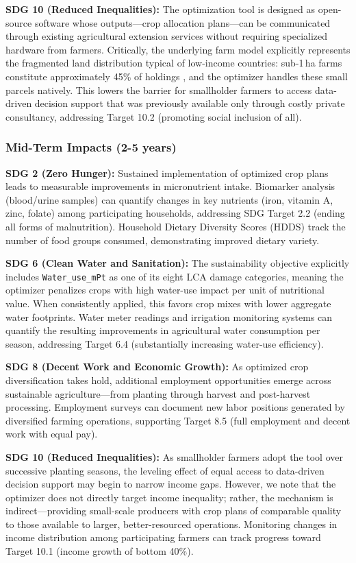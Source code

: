\documentclass{oqireport}
\begin{document}
\textbf{SDG 10 (Reduced Inequalities):} The optimization tool is designed as open-source software whose outputs---crop allocation plans---can be communicated through existing agricultural extension services without requiring specialized hardware from farmers. Critically, the underlying farm model explicitly represents the fragmented land distribution typical of low-income countries: sub-1\,ha farms constitute approximately 45\% of holdings \cite{LOWDER201616}, and the optimizer handles these small parcels natively. This lowers the barrier for smallholder farmers to access data-driven decision support that was previously available only through costly private consultancy, addressing Target 10.2 (promoting social inclusion of all).

\subsubsection{Mid-Term Impacts (2-5 years)}

\textbf{SDG 2 (Zero Hunger):} Sustained implementation of optimized crop plans leads to measurable improvements in micronutrient intake. Biomarker analysis (blood/urine samples) can quantify changes in key nutrients (iron, vitamin A, zinc, folate) among participating households, addressing SDG Target 2.2 (ending all forms of malnutrition). Household Dietary Diversity Scores (HDDS) track the number of food groups consumed, demonstrating improved dietary variety.

\textbf{SDG 6 (Clean Water and Sanitation):} The sustainability objective explicitly includes \texttt{Water\_use\_mPt} as one of its eight LCA damage categories, meaning the optimizer penalizes crops with high water-use impact per unit of nutritional value. When consistently applied, this favors crop mixes with lower aggregate water footprints. Water meter readings and irrigation monitoring systems can quantify the resulting improvements in agricultural water consumption per season, addressing Target 6.4 (substantially increasing water-use efficiency).

\textbf{SDG 8 (Decent Work and Economic Growth):} As optimized crop diversification takes hold, additional employment opportunities emerge across sustainable agriculture---from planting through harvest and post-harvest processing. Employment surveys can document new labor positions generated by diversified farming operations, supporting Target 8.5 (full employment and decent work with equal pay).

\textbf{SDG 10 (Reduced Inequalities):} As smallholder farmers adopt the tool over successive planting seasons, the leveling effect of equal access to data-driven decision support may begin to narrow income gaps. However, we note that the optimizer does not directly target income inequality; rather, the mechanism is indirect---providing small-scale producers with crop plans of comparable quality to those available to larger, better-resourced operations. Monitoring changes in income distribution among participating farmers can track progress toward Target 10.1 (income growth of bottom 40\%).
\end{document}
